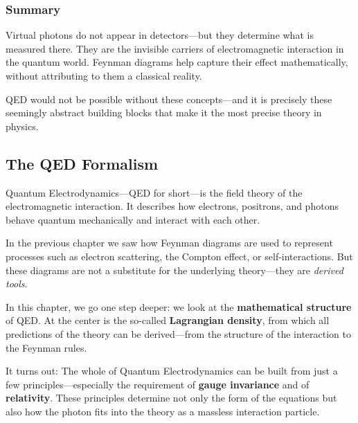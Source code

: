\subsubsection{Summary}

Virtual photons do not appear in detectors—but they determine what is measured there. They are the invisible carriers of electromagnetic interaction in the quantum world. Feynman diagrams help capture their effect mathematically, without attributing to them a classical reality.

QED would not be possible without these concepts—and it is precisely these seemingly abstract building blocks that make it the most precise theory in physics.

\subsection{The QED Formalism}

Quantum Electrodynamics—QED for short—is the field theory of the electromagnetic interaction. It describes how electrons, positrons, and photons behave quantum mechanically and interact with each other.

In the previous chapter we saw how Feynman diagrams are used to represent processes such as electron scattering, the Compton effect, or self-interactions. But these diagrams are not a substitute for the underlying theory—they are \emph{derived tools}.

In this chapter, we go one step deeper: we look at the \textbf{mathematical structure} of QED. At the center is the so-called \textbf{Lagrangian density}, from which all predictions of the theory can be derived—from the structure of the interaction to the Feynman rules.

It turns out: The whole of Quantum Electrodynamics can be built from just a few principles—especially the requirement of \textbf{gauge invariance} and of \textbf{relativity}. These principles determine not only the form of the equations but also how the photon fits into the theory as a massless interaction particle.

